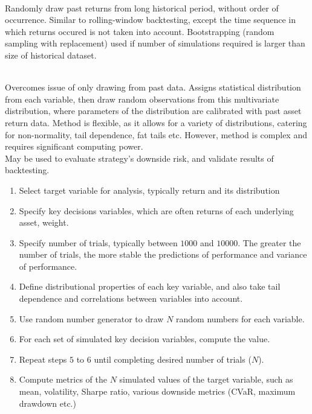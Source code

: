 \begin{remark} \\
Randomly draw past returns from long historical period, without order of occurrence. Similar to rolling-window backtesting, except the time sequence in which returns occured is not taken into account. Bootstrapping (random sampling with replacement) used if number of simulations required is larger than size of historical dataset.
\end{remark}

\begin{remark} \\
Overcomes issue of only drawing from past data. Assigns statistical distribution from each variable, then draw random observations from this multivariate distribution, where parameters of the distribution are calibrated with past asset return data. Method is flexible, as it allows for a variety of distributions, catering for non-normality, tail dependence, fat tails etc. However, method is complex and requires significant computing power.\\
May be used to evaluate strategy's downside risk, and validate results of backtesting.
\end{remark}

\begin{method} 
\begin{enumerate}[label=\arabic*.]
\setlength{\itemsep}{0pt}
\item Select target variable for analysis, typically return and its distribution
\item Specify key decisions variables, which are often returns of each underlying asset, weight.
\item Specify number of trials, typically between $1000$ and $10000$. The greater the number of trials, the more stable the predictions of performance and variance of performance.
\item Define distributional properties of each key variable, and also take tail dependence and correlations between variables into account.
\item Use random number generator to draw $N$ random numbers for each variable.
\item For each set of simulated key decision variables, compute the value.
\item Repeat steps $5$ to $6$ until completing desired number of trials ($N$).
\item Compute metrics of the $N$ simulated values of the target variable, such as mean, volatility, Sharpe ratio, various downside metrics (CVaR, maximum drawdown etc.)
\end{enumerate}
\end{method}

